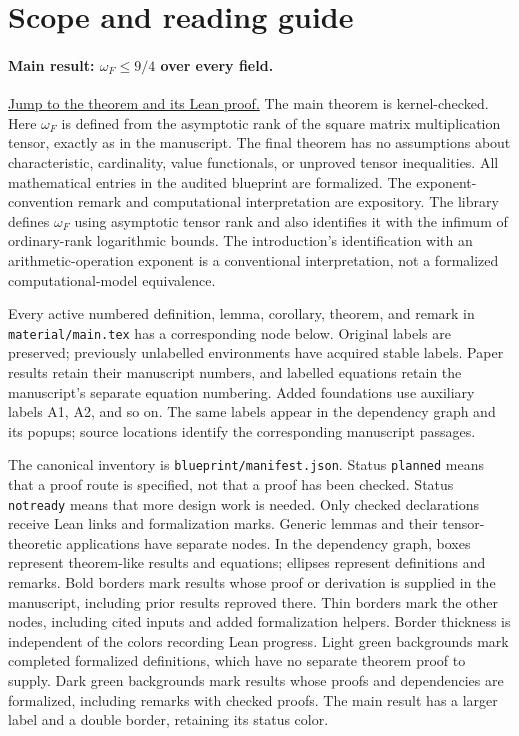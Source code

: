 \section{Scope and reading guide}
\paragraph{Main result: $\omega_F\le9/4$ over every field.}
\hyperref[thm:omega-le-nine-fourths]{Jump to the theorem and its Lean proof.}
The main theorem is kernel-checked.
Here $\omega_F$ is defined from the asymptotic rank of the square matrix multiplication
tensor, exactly as in the manuscript. The final theorem has no assumptions
about characteristic, cardinality, value functionals, or unproved tensor inequalities.
All mathematical entries in the audited blueprint are formalized.
The exponent-convention remark and computational interpretation are expository.
The library defines $\omega_F$ using asymptotic tensor rank and also identifies
it with the infimum of ordinary-rank logarithmic bounds. The introduction's
identification with an arithmetic-operation exponent is a conventional
interpretation, not a formalized computational-model equivalence.

Every active numbered definition, lemma, corollary, theorem, and remark in
\texttt{material/main.tex} has a corresponding node below. Original labels are
preserved; previously unlabelled environments have acquired stable labels.
Paper results retain their manuscript numbers, and labelled equations retain
the manuscript's separate equation numbering. Added foundations use auxiliary
labels A1, A2, and so on. The same labels appear in the dependency graph and its
popups; source locations identify the corresponding manuscript passages.

The canonical inventory is \texttt{blueprint/manifest.json}. Status
\texttt{planned} means that a proof route is specified, not that a proof has been
checked. Status \texttt{notready} means that more design work is needed.
Only checked declarations receive Lean links and formalization marks. Generic
lemmas and their tensor-theoretic applications have separate nodes.
In the dependency graph, boxes represent theorem-like results and equations; ellipses
represent definitions and remarks. Bold borders mark results whose proof or derivation is
supplied in the manuscript, including prior results reproved there. Thin borders
mark the other nodes, including cited inputs and added formalization helpers.
Border thickness is independent of the colors recording Lean progress.
Light green backgrounds mark completed formalized definitions, which have no
separate theorem proof to supply. Dark green backgrounds mark results whose
proofs and dependencies are formalized, including remarks with checked proofs.
The main result has a larger label and a double border, retaining its status color.

